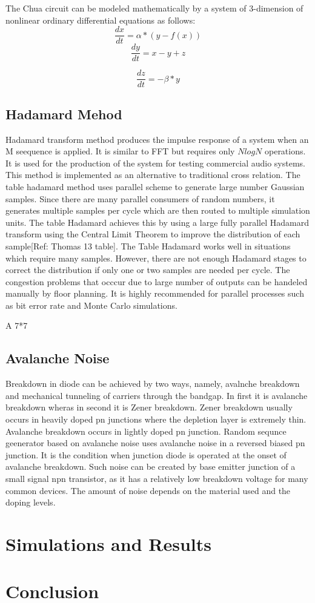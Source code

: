\documentclass[10pt,conference]{IEEEtran}
\begin{document}
The Chua circuit can be modeled mathematically by a system of 3-dimension of nonlinear ordinary differential equations as follows:
\begin{equation}
\frac{dx}{dt}= \alpha*(y-f(x))
\end{equation}
\begin{equation}
\frac{dy}{dt}= x-y+z
\end{equation}

\begin{equation}
\frac{dz}{dt}= -\beta*y 
\end{equation}



\subsection{Hadamard Mehod}
Hadamard transform method produces the impulse response of a system when an M seequence is applied. It is similar to FFT but requires only $NlogN$ operations. It is used for the production of the system for testing commercial audio systems. This method is implemented as an alternative to traditional cross relation. The table hadamard method uses parallel scheme to generate large number Gaussian samples. Since there are many parallel consumers of random numbers, it generates multiple samples per cycle  which are then routed to multiple simulation units. The table Hadamard achieves this by using a large fully parallel Hadamard transform using the Central Limit Theorem to improve the distribution of each sample[Ref: Thomas 13 table]. The Table Hadamard works well in situations which require many samples. However, there are not enough Hadamard stages to correct the distribution if only one or two samples are needed per cycle.  The congestion problems that occcur due to large number of outputs can be handeled manually by floor planning. It is highly recommended for parallel processes such as bit error rate and Monte Carlo simulations.

A 7*7

\subsection{Avalanche Noise}
 
 Breakdown in diode can be achieved by two ways, namely, avalnche breakdown and mechanical tunneling of carriers through the bandgap. In first it is avalanche breakdown wheras in second it is Zener breakdown. Zener breakdown usually occurs in heavily doped pn junctions where the depletion layer is extremely thin. Avalanche breakdown occurs in lightly doped pn junction. Random sequnce geenerator based on avalanche noise uses avalanche noise in a reversed biased pn junction. It is the condition when junction diode is operated at the onset of avalanche breakdown. Such noise can be created by base emitter junction of a small signal npn transistor, as it has a relatively low breakdown voltage for many common devices. The amount of noise depends on the material used and the doping levels.

\section{Simulations and Results} \label{d}

\section{Conclusion} \label{e}
\end{document}

